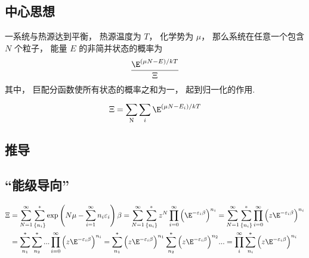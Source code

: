 
\subsection{中心思想}
一系统与热源达到平衡， 热源温度为 $T$，  化学势为 $\mu $，  那么系统在任意一个包含 $N$ 个粒子， 能量 $E$ 的非简并状态的概率为
\begin{equation}
\frac{\E^{(\mu N - E)/kT}}{\Xi }
\end{equation}
其中， 巨配分函数使所有状态的概率之和为一， 起到归一化的作用.
\begin{equation}
\Xi  = \sum\limits_{\rm{N}}^{} {\sum\limits_i^{} {\E^{(\mu N - {E_i})/kT}} } \end{equation}
\subsection{推导} %

\subsection{“能级导向”}

\begin{equation}
\begin{aligned}
\Xi & = \sum\limits_{N = 1}^\infty  {\sum\limits_{\{ {n_i}\} }^ *  {\exp \left( {N\mu  - \sum\limits_{i = 1}^\infty  {{n_i}{\varepsilon_i}} } \right)\beta } }  = \sum\limits_{N = 1}^\infty  {\sum\limits_{\{ {n_i}\} }^ *  {{z^N}\prod\limits_{i = 0}^\infty  {{\left( {\E^{ - {\varepsilon_i}\beta }} \right)}^{n_i}} } }  = \sum\limits_{N = 1}^\infty  {\sum\limits_{\{ {n_i}\} }^ *  {\prod\limits_{i = 0}^\infty  {{\left( {z{\E^{ - {\varepsilon_i}\beta }}} \right)}^{n_i}} } } \\
 &= \sum\limits_{n_1}^ *  {\sum\limits_{n_2}^ *  {...\prod\limits_{i = 0}^\infty  {{\left( {z{\E^{ - {\varepsilon_i}\beta }}} \right)}^{n_i}} } }  = \sum\limits_{n_1}^ *  {{\left( {z{\E^{ - {\varepsilon_i}\beta }}} \right)}^{n_1}} \sum\limits_{n_2}^ *  {{\left( {z{\E^{ - {\varepsilon_i}\beta }}} \right)}^{n_2}} ... = \prod\limits_i^\infty  {\sum\limits_{n_i}^ *  {{\left( {z{\E^{ - {\varepsilon_i}\beta }}} \right)}^{n_i}} }
\end{aligned}
\end{equation}
